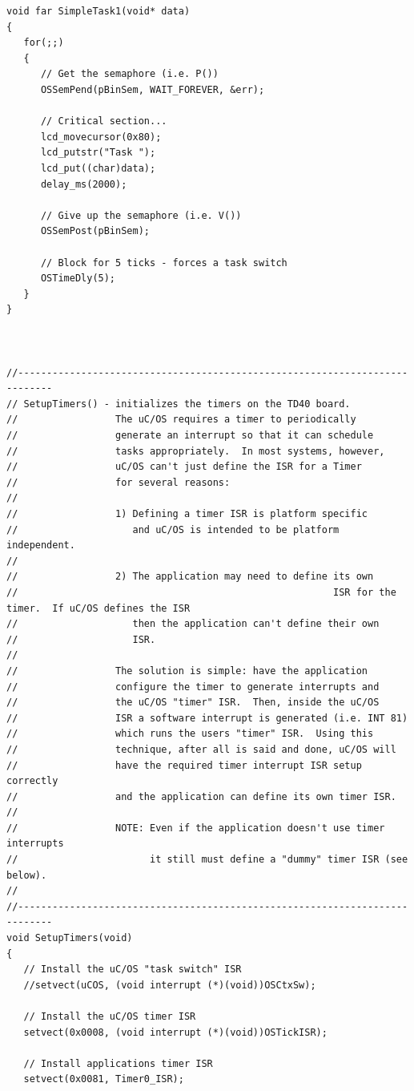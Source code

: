 \begin{verbatim}
void far SimpleTask1(void* data)
{
   for(;;)
   {
      // Get the semaphore (i.e. P())
      OSSemPend(pBinSem, WAIT_FOREVER, &err);

      // Critical section...
      lcd_movecursor(0x80);
      lcd_putstr("Task ");
      lcd_put((char)data);
      delay_ms(2000);

      // Give up the semaphore (i.e. V())
      OSSemPost(pBinSem);

      // Block for 5 ticks - forces a task switch
      OSTimeDly(5);
   }
}



//----------------------------------------------------------------------------
// SetupTimers() - initializes the timers on the TD40 board.
//                 The uC/OS requires a timer to periodically
//                 generate an interrupt so that it can schedule
//                 tasks appropriately.  In most systems, however,
//                 uC/OS can't just define the ISR for a Timer
//                 for several reasons:
//
//                 1) Defining a timer ISR is platform specific
//                    and uC/OS is intended to be platform independent.
//
//                 2) The application may need to define its own
//                                                       ISR for the timer.  If uC/OS defines the ISR
//                    then the application can't define their own
//                    ISR.
//
//                 The solution is simple: have the application
//                 configure the timer to generate interrupts and
//                 the uC/OS "timer" ISR.  Then, inside the uC/OS
//                 ISR a software interrupt is generated (i.e. INT 81)
//                 which runs the users "timer" ISR.  Using this
//                 technique, after all is said and done, uC/OS will
//                 have the required timer interrupt ISR setup correctly
//                 and the application can define its own timer ISR.
//
//                 NOTE: Even if the application doesn't use timer interrupts
//                       it still must define a "dummy" timer ISR (see below).
//
//----------------------------------------------------------------------------
void SetupTimers(void)
{
   // Install the uC/OS "task switch" ISR
   //setvect(uCOS, (void interrupt (*)(void))OSCtxSw);

   // Install the uC/OS timer ISR
   setvect(0x0008, (void interrupt (*)(void))OSTickISR);

   // Install applications timer ISR
   setvect(0x0081, Timer0_ISR);


\end{verbatim}

